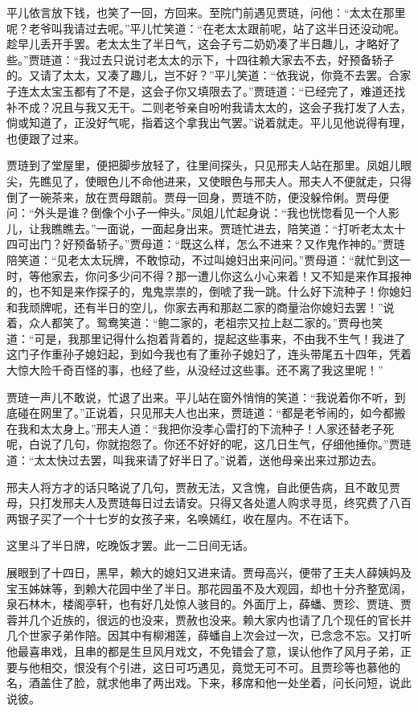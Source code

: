 平儿依言放下钱，也笑了一回，方回来。至院门前遇见贾琏，问他：“太太在那里呢？老爷叫我请过去呢。”平儿忙笑道：“在老太太跟前呢，站了这半日还没动呢。趁早儿丢开手罢。老太太生了半日气，这会子亏二奶奶凑了半日趣儿，才略好了些。”贾琏道：“我过去只说讨老太太的示下，十四往赖大家去不去，好预备轿子的。又请了太太，又凑了趣儿，岂不好？”平儿笑道：“依我说，你竟不去罢。合家子连太太宝玉都有了不是，这会子你又填限去了。”贾琏道：“已经完了，难道还找补不成？况且与我又无干。二则老爷亲自吩咐我请太太的，这会子我打发了人去，倘或知道了，正没好气呢，指着这个拿我出气罢。”说着就走。平儿见他说得有理，也便跟了过来。

贾琏到了堂屋里，便把脚步放轻了，往里间探头，只见邢夫人站在那里。凤姐儿眼尖，先瞧见了，使眼色儿不命他进来，又使眼色与邢夫人。邢夫人不便就走，只得倒了一碗茶来，放在贾母跟前。贾母一回身，贾琏不防，便没躲伶俐。贾母便问：“外头是谁？倒像个小子一伸头。”凤姐儿忙起身说：“我也恍惚看见一个人影儿，让我瞧瞧去。”一面说，一面起身出来。贾琏忙进去，陪笑道：“打听老太太十四可出门？好预备轿子。”贾母道：“既这么样，怎么不进来？又作鬼作神的。”贾琏陪笑道：“见老太太玩牌，不敢惊动，不过叫媳妇出来问问。”贾母道：“就忙到这一时，等他家去，你问多少问不得？那一遭儿你这么小心来着！又不知是来作耳报神的，也不知是来作探子的，鬼鬼祟祟的，倒唬了我一跳。什么好下流种子！你媳妇和我顽牌呢，还有半日的空儿，你家去再和那赵二家的商量治你媳妇去罢！”说着，众人都笑了。鸳鸯笑道：“鲍二家的，老祖宗又拉上赵二家的。”贾母也笑道：“可是，我那里记得什么抱着背着的，提起这些事来，不由我不生气！我进了这门子作重孙子媳妇起，到如今我也有了重孙子媳妇了，连头带尾五十四年，凭着大惊大险千奇百怪的事，也经了些，从没经过这些事。还不离了我这里呢！”

贾琏一声儿不敢说，忙退了出来。平儿站在窗外悄悄的笑道：“我说着你不听，到底碰在网里了。”正说着，只见邢夫人也出来，贾琏道：“都是老爷闹的，如今都搬在我和太太身上。”邢夫人道：“我把你没孝心雷打的下流种子！人家还替老子死呢，白说了几句，你就抱怨了。你还不好好的呢，这几日生气，仔细他捶你。”贾琏道：“太太快过去罢，叫我来请了好半日了。”说着，送他母亲出来过那边去。

邢夫人将方才的话只略说了几句，贾赦无法，又含愧，自此便告病，且不敢见贾母，只打发邢夫人及贾琏每日过去请安。只得又各处遣人购求寻觅，终究费了八百两银子买了一个十七岁的女孩子来，名唤嫣红，收在屋内。不在话下。

这里斗了半日牌，吃晚饭才罢。此一二日间无话。

展眼到了十四日，黑早，赖大的媳妇又进来请。贾母高兴，便带了王夫人薛姨妈及宝玉姊妹等，到赖大花园中坐了半日。那花园虽不及大观园，却也十分齐整宽阔，泉石林木，楼阁亭轩，也有好几处惊人骇目的。外面厅上，薛蟠、贾珍、贾琏、贾蓉并几个近族的，很远的也没来，贾赦也没来。赖大家内也请了几个现任的官长并几个世家子弟作陪。因其中有柳湘莲，薛蟠自上次会过一次，已念念不忘。又打听他最喜串戏，且串的都是生旦风月戏文，不免错会了意，误认他作了风月子弟，正要与他相交，恨没有个引进，这日可巧遇见，竟觉无可不可。且贾珍等也慕他的名，酒盖住了脸，就求他串了两出戏。下来，移席和他一处坐着，问长问短，说此说彼。


